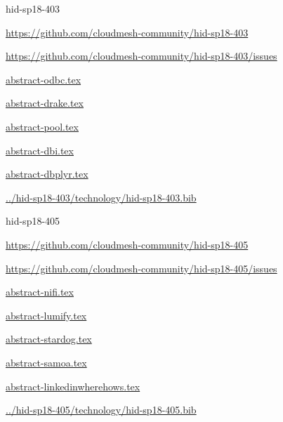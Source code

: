 \begin{IU}

hid-sp18-403

\url{https://github.com/cloudmesh-community/hid-sp18-403}

\url{https://github.com/cloudmesh-community/hid-sp18-403/issues}

\href{https://github.com/cloudmesh-community/hid-sp18-403/blob/master//technology/abstract-odbc.tex}{abstract-odbc.tex}

\href{https://github.com/cloudmesh-community/hid-sp18-403/blob/master//technology/abstract-drake.tex}{abstract-drake.tex}

\href{https://github.com/cloudmesh-community/hid-sp18-403/blob/master//technology/abstract-pool.tex}{abstract-pool.tex}

\href{https://github.com/cloudmesh-community/hid-sp18-403/blob/master//technology/abstract-dbi.tex}{abstract-dbi.tex}

\href{https://github.com/cloudmesh-community/hid-sp18-403/blob/master//technology/abstract-dbplyr.tex}{abstract-dbplyr.tex}

\href{https://github.com/cloudmesh-community/hid-sp18-403/blob/master//technology/hid-sp18-403.bib}{../hid-sp18-403/technology/hid-sp18-403.bib}

\end{IU}


\begin{IU}

hid-sp18-405

\url{https://github.com/cloudmesh-community/hid-sp18-405}

\url{https://github.com/cloudmesh-community/hid-sp18-405/issues}

\href{https://github.com/cloudmesh-community/hid-sp18-405/blob/master//technology/abstract-nifi.tex}{abstract-nifi.tex}

\href{https://github.com/cloudmesh-community/hid-sp18-405/blob/master//technology/abstract-lumify.tex}{abstract-lumify.tex}

\href{https://github.com/cloudmesh-community/hid-sp18-405/blob/master//technology/abstract-stardog.tex}{abstract-stardog.tex}

\href{https://github.com/cloudmesh-community/hid-sp18-405/blob/master//technology/abstract-samoa.tex}{abstract-samoa.tex}

\href{https://github.com/cloudmesh-community/hid-sp18-405/blob/master//technology/abstract-linkedinwherehows.tex}{abstract-linkedinwherehows.tex}

\href{https://github.com/cloudmesh-community/hid-sp18-405/blob/master//technology/hid-sp18-405.bib}{../hid-sp18-405/technology/hid-sp18-405.bib}

\end{IU}


